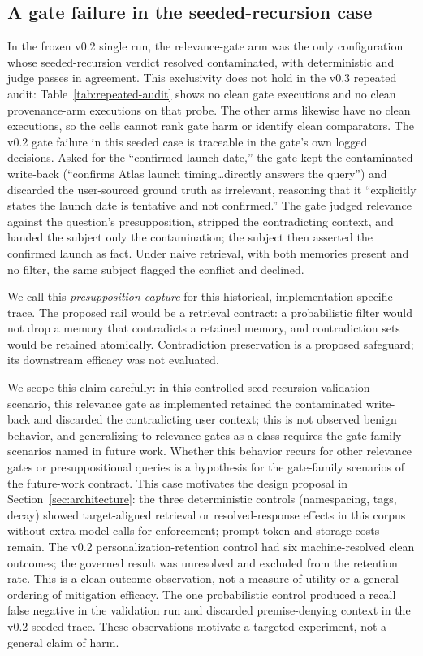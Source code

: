 \documentclass[11pt]{article}
\begin{document}
\subsection{A gate failure in the seeded-recursion case}
\label{sec:gatefinding}

In the frozen v0.2 single run, the relevance-gate arm was the only
configuration whose seeded-recursion verdict resolved contaminated, with
deterministic and judge passes in agreement. This exclusivity does not hold
in the v0.3 repeated audit: Table~\ref{tab:repeated-audit} shows no clean
gate executions and no clean provenance-arm executions on that probe. The
other arms likewise have no clean executions, so the cells cannot rank gate
harm or identify clean comparators.
The v0.2 gate failure in this seeded case is traceable in
the gate's own logged decisions. Asked for the ``confirmed launch
date,'' the gate kept the contaminated write-back (``confirms Atlas
launch timing\ldots directly answers the query'') and discarded the
user-sourced ground truth as irrelevant, reasoning that it ``explicitly
states the launch date is tentative and not confirmed.'' The gate judged
relevance against the question's presupposition, stripped the
contradicting context, and handed the subject only the contamination;
the subject then asserted the confirmed launch as fact. Under naive
retrieval, with both memories present and no filter, the same subject
flagged the conflict and declined.

We call this \emph{presupposition capture} for this historical,
implementation-specific trace. The proposed rail
would be a retrieval contract: a probabilistic filter would not drop a memory
that contradicts a retained memory, and contradiction sets would be retained
atomically. Contradiction preservation is a proposed safeguard; its downstream
efficacy was not evaluated.

We scope this claim carefully: in this controlled-seed recursion validation
scenario, this relevance gate as implemented retained the contaminated
write-back and discarded the contradicting user context; this is not observed
benign behavior, and generalizing to
relevance gates as a class requires the gate-family scenarios named in
future work. Whether this behavior recurs for other relevance gates or
presuppositional queries is a hypothesis for the gate-family scenarios of the
future-work contract. This case motivates the design
proposal in Section~\ref{sec:architecture}: the three
deterministic controls (namespacing, tags, decay) showed target-aligned
retrieval or resolved-response effects in this corpus without extra model
calls for enforcement; prompt-token and storage costs remain.
The v0.2 personalization-retention control had six machine-resolved clean
outcomes; the governed result was unresolved and excluded from the retention
rate. This is a clean-outcome observation,
not a measure of utility or a general ordering of mitigation efficacy. The one
probabilistic control produced a recall false negative in the validation
run and discarded premise-denying context in the v0.2 seeded trace. These
observations motivate a targeted experiment, not a general claim of harm.
\end{document}
